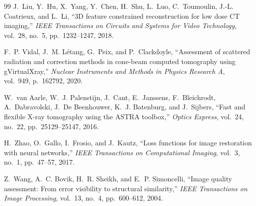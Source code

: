 \documentclass[10pt,twocolumn]{article}
\begin{document}
\begin{thebibliography}{99}
J.~Liu, Y.~Hu, X.~Yang, Y.~Chen, H.~Shu, L.~Luo, C.~Toumoulin,
J.-L. Coatrieux, and L.~Li,
``3D feature constrained reconstruction for low dose CT imaging,''
\textit{IEEE Transactions on Circuits and Systems for Video Technology},
vol.~28, no.~5, pp.~1232--1247, 2018.

F.~P. Vidal, J.~M. L\'{e}tang, G.~Peix, and P.~Clackdoyle,
``Assessment of scattered radiation and correction methods in
cone-beam computed tomography using gVirtualXray,''
\textit{Nuclear Instruments and Methods in Physics Research A},
vol.~949, p.~162792, 2020.

W.~van Aarle, W.~J. Palenstijn, J.~Cant, E.~Janssens, F.~Bleichrodt,
A.~Dabravolski, J.~De Beenhouwer, K.~J. Batenburg, and J.~Sijbers,
``Fast and flexible X-ray tomography using the ASTRA toolbox,''
\textit{Optics Express},
vol.~24, no.~22, pp.~25129--25147, 2016.

H.~Zhao, O.~Gallo, I.~Frosio, and J.~Kautz,
``Loss functions for image restoration with neural networks,''
\textit{IEEE Transactions on Computational Imaging},
vol.~3, no.~1, pp.~47--57, 2017.

Z.~Wang, A.~C. Bovik, H.~R. Sheikh, and E.~P. Simoncelli,
``Image quality assessment: From error visibility to structural similarity,''
\textit{IEEE Transactions on Image Processing},
vol.~13, no.~4, pp.~600--612, 2004.

\end{thebibliography}
\end{document}
